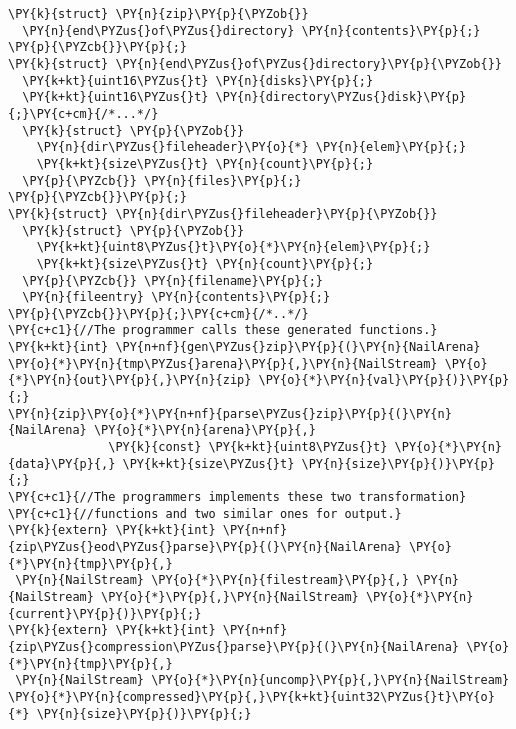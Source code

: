 \begin{Verbatim}[commandchars=\\\{\},codes={\catcode`\$=3\catcode`\^=7\catcode`\_=8}]
\PY{k}{struct} \PY{n}{zip}\PY{p}{\PYZob{}}
  \PY{n}{end\PYZus{}of\PYZus{}directory} \PY{n}{contents}\PY{p}{;}
\PY{p}{\PYZcb{}}\PY{p}{;}
\PY{k}{struct} \PY{n}{end\PYZus{}of\PYZus{}directory}\PY{p}{\PYZob{}}
  \PY{k+kt}{uint16\PYZus{}t} \PY{n}{disks}\PY{p}{;}
  \PY{k+kt}{uint16\PYZus{}t} \PY{n}{directory\PYZus{}disk}\PY{p}{;}\PY{c+cm}{/*...*/}
  \PY{k}{struct} \PY{p}{\PYZob{}}
    \PY{n}{dir\PYZus{}fileheader}\PY{o}{*} \PY{n}{elem}\PY{p}{;}
    \PY{k+kt}{size\PYZus{}t} \PY{n}{count}\PY{p}{;}
  \PY{p}{\PYZcb{}} \PY{n}{files}\PY{p}{;}
\PY{p}{\PYZcb{}}\PY{p}{;}
\PY{k}{struct} \PY{n}{dir\PYZus{}fileheader}\PY{p}{\PYZob{}}
  \PY{k}{struct} \PY{p}{\PYZob{}}
    \PY{k+kt}{uint8\PYZus{}t}\PY{o}{*}\PY{n}{elem}\PY{p}{;}
    \PY{k+kt}{size\PYZus{}t} \PY{n}{count}\PY{p}{;}
  \PY{p}{\PYZcb{}} \PY{n}{filename}\PY{p}{;}
  \PY{n}{fileentry} \PY{n}{contents}\PY{p}{;}
\PY{p}{\PYZcb{}}\PY{p}{;}\PY{c+cm}{/*..*/}
\PY{c+c1}{//The programmer calls these generated functions.}
\PY{k+kt}{int} \PY{n+nf}{gen\PYZus{}zip}\PY{p}{(}\PY{n}{NailArena} \PY{o}{*}\PY{n}{tmp\PYZus{}arena}\PY{p}{,}\PY{n}{NailStream} \PY{o}{*}\PY{n}{out}\PY{p}{,}\PY{n}{zip} \PY{o}{*}\PY{n}{val}\PY{p}{)}\PY{p}{;}
\PY{n}{zip}\PY{o}{*}\PY{n+nf}{parse\PYZus{}zip}\PY{p}{(}\PY{n}{NailArena} \PY{o}{*}\PY{n}{arena}\PY{p}{,} 
              \PY{k}{const} \PY{k+kt}{uint8\PYZus{}t} \PY{o}{*}\PY{n}{data}\PY{p}{,} \PY{k+kt}{size\PYZus{}t} \PY{n}{size}\PY{p}{)}\PY{p}{;}
\PY{c+c1}{//The programmers implements these two transformation}
\PY{c+c1}{//functions and two similar ones for output.}
\PY{k}{extern} \PY{k+kt}{int} \PY{n+nf}{zip\PYZus{}eod\PYZus{}parse}\PY{p}{(}\PY{n}{NailArena} \PY{o}{*}\PY{n}{tmp}\PY{p}{,}
 \PY{n}{NailStream} \PY{o}{*}\PY{n}{filestream}\PY{p}{,} \PY{n}{NailStream} \PY{o}{*}\PY{p}{,}\PY{n}{NailStream} \PY{o}{*}\PY{n}{current}\PY{p}{)}\PY{p}{;}
\PY{k}{extern} \PY{k+kt}{int} \PY{n+nf}{zip\PYZus{}compression\PYZus{}parse}\PY{p}{(}\PY{n}{NailArena} \PY{o}{*}\PY{n}{tmp}\PY{p}{,}
 \PY{n}{NailStream} \PY{o}{*}\PY{n}{uncomp}\PY{p}{,}\PY{n}{NailStream} \PY{o}{*}\PY{n}{compressed}\PY{p}{,}\PY{k+kt}{uint32\PYZus{}t}\PY{o}{*} \PY{n}{size}\PY{p}{)}\PY{p}{;}
\end{Verbatim}
